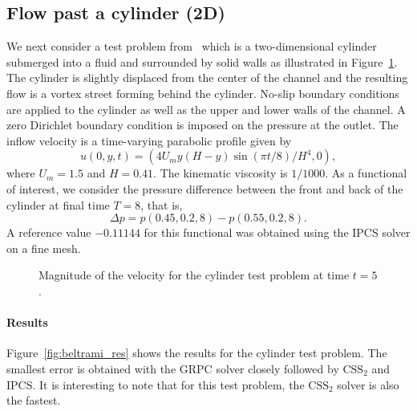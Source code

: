 \subsection{Flow past a cylinder (2D)}

We next consider a test problem from~\cite{turek} which is a
two-dimensional cylinder submerged into a fluid and surrounded by
solid walls as illustrated in
Figure~\ref{fig:cylinder_illustration}. The cylinder is slightly
displaced from the center of the channel and the resulting flow is a
vortex street forming behind the cylinder. No-slip boundary conditions
are applied to the cylinder as well as the upper and lower walls of
the channel. A zero Dirichlet boundary condition is imposed on the
pressure at the outlet. The inflow velocity is a time-varying
parabolic profile given by
\begin{equation} \label{eq:cyl_inflow}
  u(0, y, t) = (4 U_m y (H - y) \sin(\pi t/8)/H^{4}, 0),
\end{equation}
where $U_m = 1.5$ and $H = 0.41$. The kinematic viscosity is $1/1000$.
As a functional of interest, we consider the pressure difference
between the front and back of the cylinder at final time $T = 8$, that
is,
\begin{equation}\label{eq:dp}
  \Delta p = p(0.45, 0.2, 8) - p(0.55, 0.2, 8).
\end{equation}
A reference value $-0.11144$ for this functional was obtained using
the IPCS solver on a fine mesh.

\begin{figure}
  \begin{center}
    \caption{Magnitude of the velocity for the cylinder test problem at
      time $t = 5$.}
    \label{fig:cylinder_illustration}
  \end{center}
\end{figure}

\paragraph{Results}

Figure~\ref{fig:beltrami_res} shows the results for the cylinder test
problem. The smallest error is obtained with the GRPC solver closely
followed by $\mathrm{CSS}_2$ and IPCS. It is interesting to note that
for this test problem, the $\mathrm{CSS}_2$ solver is also the
fastest.

